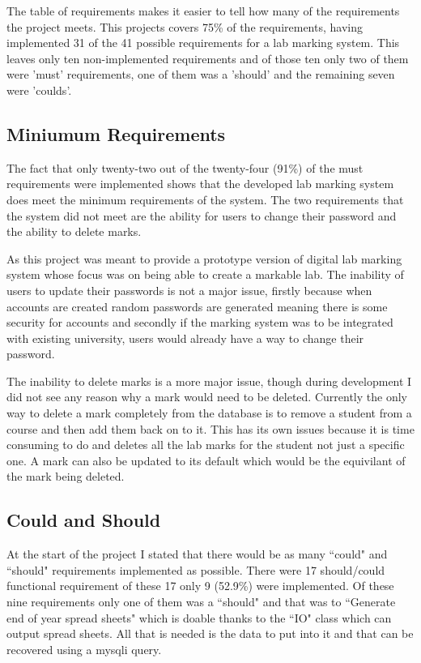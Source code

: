 \documentclass[11pt]{report}
\begin{document}
The table of requirements makes it easier to tell how many of the requirements the project meets. This projects covers 75\% of the requirements, having implemented 31 of the 41 possible requirements for a lab marking system. This leaves only ten non-implemented requirements and of those ten only two of them were 'must' requirements, one of them was a 'should' and the remaining seven were 'coulds'.

\subsection*{Miniumum Requirements}

The fact that only twenty-two out of the twenty-four (91\%) of the  must requirements were  implemented shows that the developed lab marking system does meet the minimum requirements of the system. The two requirements that the system did not meet are the ability for users to change their password and the ability to delete marks.

As this project was meant to provide a prototype version of digital lab marking system whose focus was on being able to create a markable lab. The inability of users to update their passwords is not a major issue, firstly because when accounts are created random passwords are generated meaning there is some security for accounts and secondly if the marking system was to be integrated with existing university, users would already have a way to change their password.

The inability to delete marks is a more major issue, though during development I did not see any reason  why a mark would need to be deleted. Currently the only way to delete a mark completely from the database is to remove a student from a course and then add them back on to it. This has its own issues because it is time consuming to do and deletes all the lab marks for the student not just a specific one. A mark can also be updated to its default which would be the equivilant of the mark being deleted.

\subsection*{Could and Should}

At the start of the project I stated that there would be as many ``could" and ``should" requirements implemented as possible. There were 17 should/could functional requirement of these 17 only 9 (52.9\%) were implemented. Of these nine requirements only one of them was a ``should" and that was to ``Generate end of year spread sheets" which is doable thanks to the ``IO" class which can output spread sheets. All that is needed is the data to put into it and that can be recovered using a mysqli query.    
\end{document}
